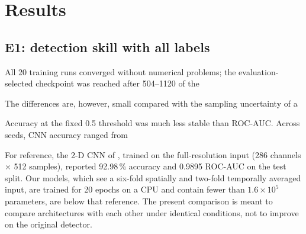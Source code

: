 \section*{Results}
\subsection*{E1: detection skill with all labels}
All 20 training runs converged without numerical problems; the evaluation-selected checkpoint was reached after 504--1120 of the %

The differences are, however, small compared with the sampling uncertainty of a %

Accuracy at the fixed 0.5 threshold was much less stable than ROC-AUC. Across seeds, CNN accuracy ranged from %

For reference, the 2-D CNN of \citet{HuotArxiv2022}, trained on the full-resolution input (286 channels $\times$ 512 samples), reported 92.98\,\% accuracy and 0.9895 ROC-AUC on the test split. Our models, which see a six-fold spatially and two-fold temporally averaged input, are trained for 20 epochs on a CPU and contain fewer than $1.6\times10^5$ parameters, are below that reference. The present comparison is meant to compare architectures with each other under identical conditions, not to improve on the original detector.


